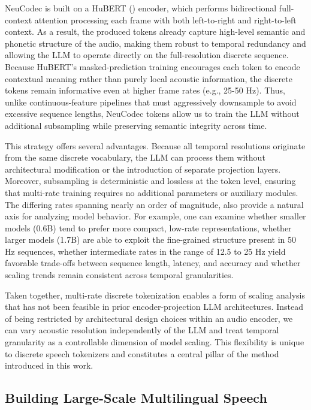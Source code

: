 \documentclass{article}
\begin{document}
NeuCodec is built on a HuBERT (\citet{hsu2021hubertselfsupervisedspeechrepresentation}) encoder, which performs bidirectional full-context attention processing each frame with both left-to-right and right-to-left context. As a result, the produced tokens already capture high-level semantic and phonetic structure of the audio, making them robust to temporal redundancy and allowing the LLM to operate directly on the full-resolution discrete sequence. Because HuBERT's masked-prediction training encourages each token to encode contextual meaning rather than purely local acoustic information, the discrete tokens remain informative even at higher frame rates (e.g., 25-50 Hz). Thus, unlike continuous-feature pipelines that must aggressively downsample to avoid excessive sequence lengths, NeuCodec tokens allow us to train the LLM without additional subsampling while preserving semantic integrity across time.

This strategy offers several advantages. Because all temporal resolutions originate from the same discrete vocabulary, the LLM can process them without architectural modification or the introduction of separate projection layers. Moreover, subsampling is deterministic and lossless at the token level, ensuring that multi-rate training requires no additional parameters or auxiliary modules. The differing rates spanning nearly an order of magnitude, also provide a natural axis for analyzing model behavior. For example, one can examine whether smaller models (0.6B) tend to prefer more compact, low-rate representations, whether larger models (1.7B) are able to exploit the fine-grained structure present in 50 Hz sequences, whether intermediate rates in the range of 12.5 to 25 Hz yield favorable trade-offs between sequence length, latency, and accuracy and whether scaling trends remain consistent across temporal granularities.

Taken together, multi-rate discrete tokenization enables a form of scaling analysis that has not been feasible in prior encoder-projection LLM architectures. Instead of being restricted by architectural design choices within an audio encoder, we can vary acoustic resolution independently of the LLM and treat temporal granularity as a controllable dimension of model scaling. This flexibility is unique to discrete speech tokenizers and constitutes a central pillar of the method introduced in this work.

\subsection{Building Large-Scale Multilingual Speech}
\end{document}
